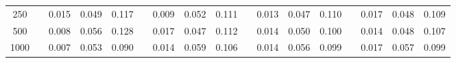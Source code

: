 % 
\begin{tabular}{ccccccccccccccccc}
  \hline
  \hline
250 &  & 0.015 & 0.049 & 0.117 &  & 0.009 & 0.052 & 0.111 &  & 0.013 & 0.047 & 0.110 &  & 0.017 & 0.048 & 0.109 \\ 
  500 &  & 0.008 & 0.056 & 0.128 &  & 0.017 & 0.047 & 0.112 &  & 0.014 & 0.050 & 0.100 &  & 0.014 & 0.048 & 0.107 \\ 
  1000 &  & 0.007 & 0.053 & 0.090 &  & 0.014 & 0.059 & 0.106 &  & 0.014 & 0.056 & 0.099 &  & 0.017 & 0.057 & 0.099 \\ 
   \hline
\end{tabular}
